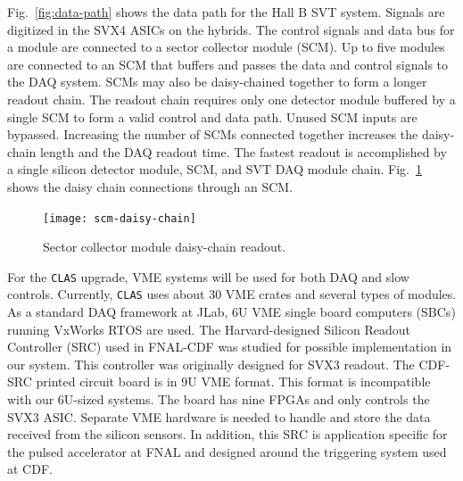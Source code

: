 Fig.~\ref{fig:data-path} shows the data path for the Hall B SVT system.
Signals are digitized in the SVX4 ASICs on the hybrids.  The control 
signals and data bus for a module are connected to a sector collector
module (SCM).  Up to five modules are connected to an SCM that buffers 
and passes the data and control signals to the DAQ system.  SCMs may also 
be daisy-chained together to form a longer readout chain.  The readout 
chain requires only one detector module buffered by a single SCM to form 
a valid control and data path.  Unused SCM inputs are bypassed.  Increasing 
the number of SCMs connected together increases the daisy-chain length and 
the DAQ readout time.  The fastest readout is accomplished by a single 
silicon detector module, SCM, and SVT DAQ module chain.  
Fig.~\ref{fig:scm-daisy-chain} shows the daisy chain connections through 
an SCM.

\begin{figure}[htbp]
\centering
\texttt{[image: scm-daisy-chain]}
\caption{\small{Sector collector module daisy-chain readout.}}
\label{fig:scm-daisy-chain}
\end{figure}

For the {\tt CLAS} upgrade, VME systems will be used for both DAQ and slow 
controls.  Currently, {\tt CLAS} uses about 30 VME crates and several types 
of modules.  As a standard DAQ framework at JLab, 6U VME single board 
computers (SBCs) running VxWorks RTOS are used.  The Harvard-designed 
Silicon Readout Controller (SRC) used in FNAL-CDF was studied for possible 
implementation in our system.  This controller was originally designed for 
SVX3 readout.  The CDF-SRC printed circuit board is in 9U VME format.  This 
format is incompatible with our 6U-sized systems.  The board has nine FPGAs 
and only controls the SVX3 ASIC.  Separate VME hardware is needed to handle 
and store the data received from the silicon sensors.  In addition, this 
SRC is application specific for the pulsed accelerator at FNAL and designed 
around the triggering system used at CDF.

